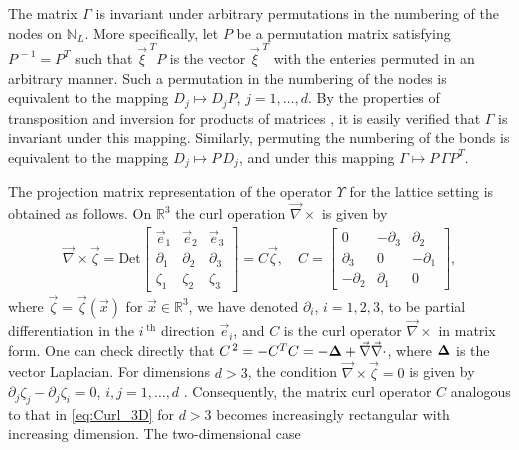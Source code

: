 \documentclass{cmslatex}
\newcommand\bDelta{\mbox{\boldmath${\Delta}$}}
\begin{document}
The matrix $\Gamma$ is invariant under arbitrary permutations in the
numbering of the nodes on $\mathbb{N}_L$. More specifically, let 
$P$ be a permutation matrix satisfying $P^{\,-1}=P^T$ such that
$\vec{\xi}^{\;T}P$ is the vector $\vec{\xi}^{\;T}$ with the enteries permuted in
an arbitrary manner. Such a permutation in the numbering of the nodes is
equivalent to the mapping $D_j\mapsto D_jP$, $j=1,\ldots,d$. By the properties of
transposition and inversion for products of matrices
\cite{Horn_Johnson-1990}, it is easily verified that $\Gamma$ is invariant
under this mapping. Similarly, permuting the numbering of
the bonds is equivalent to the mapping $D_j\mapsto P\,D_j$, and under this
mapping $\Gamma\mapsto P\,\Gamma P^T$.




The projection matrix representation of the operator $\Upsilon$ for the
lattice setting is obtained as follows. On $\mathbb{R}^3$ the curl 
operation $\vec{\nabla}\times$ is given by 
%
\begin{align}\label{eq:Curl_3D}
  \vec{\nabla}\times\vec{\zeta}=
     \text{Det}\left[
  \begin{array}{ccc}
    \vec{e}_1 &\vec{e}_2 &\vec{e}_3\\
       \partial_1    &   \partial_2    &   \partial_3   \\
       \zeta_1    &   \zeta_2    &   \zeta_3   
    \end{array}
    \right]
    =C\vec{\zeta}, \quad
    C=
    \left[
    \begin{array}{ccc}
       0  & -\partial_3  &   \partial_2 \\
       \partial_3 &  0   &  -\partial_1 \\
      -\partial_2 &  \partial_1  &   0
    \end{array}
    \right],    
\end{align}
%
where $\vec{\zeta}=\vec{\zeta}(\vec{x})$ for $\vec{x}\in\mathbb{R}^3$, we
have denoted $\partial_i$, $i=1,2,3$, to be partial differentiation in the
$i^{\;\text{th}}$ direction $\vec{e}_i$, and $C$ is the curl
operator $\vec{\nabla}\times$ in matrix form. One can check directly
that $C^{\,2}=-C^TC=-\bDelta+\vec{\nabla}\vec{\nabla}\cdot$, where $\bDelta$ is the vector
Laplacian. For dimensions $d>3$, the condition $\vec{\nabla}\times\vec{\zeta}=0$ is
given by $\partial_j\zeta_j-\partial_j\zeta_i=0$, $i,j=1,\ldots,d$
\cite{Golden:CMP-473}. Consequently, the matrix curl operator $C$
analogous to that in \eqref{eq:Curl_3D} for $d>3$ becomes increasingly 
rectangular with increasing dimension. The two-dimensional case 
\end{document}
